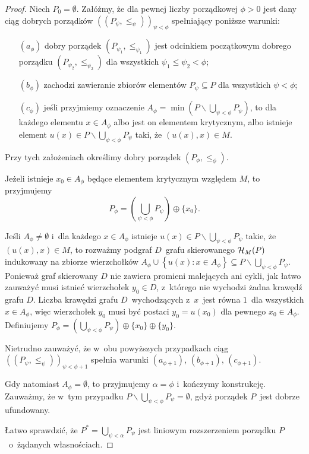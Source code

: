 \begin{proof}
Niech $P_0=\emptyset$. Załóżmy, że dla pewnej liczby porządkowej $\phi>0$ jest dany ciąg dobrych porządków $\left(\left(P_\psi,\leq_\psi\right)\right)_{\psi<\phi}$ spełniający poniższe warunki:
\begin{itemize}
\item[$(a_{\phi})$] dobry porządek $\left(P_{\psi_1},\leq_{\psi_1}\right)$ jest odcinkiem początkowym dobrego porządku $\left(P_{\psi_2},\leq_{\psi_2}\right)$ dla wszystkich $\psi_1\leq\psi_2<\phi$;
\item[$(b_{\phi})$] zachodzi zawieranie zbiorów elementów $P_\psi\subseteq P$ dla wszystkich $\psi<\phi$;
\item[$(c_{\phi})$] jeśli przyjmiemy oznaczenie $A_{\phi}=\min\left(P\smallsetminus\bigcup_{\psi<\phi}P_\psi\right)$, to dla każdego elementu $x\in A_{\phi}$ albo jest on elementem krytycznym, albo istnieje element $u(x)\in P\smallsetminus \bigcup_{\psi<\phi}P_\psi$ taki, że $(u(x),x)\in M$.
\end{itemize}
Przy tych założeniach określimy dobry porządek $\left(P_{\phi},\leq_{\phi}\right)$.

Jeżeli istnieje $x_0\in A_{\phi}$ będące elementem krytycznym względem $M$, to przyjmujemy \[P_{\phi}=\left(\bigcup_{\psi<\phi}P_\psi\right)\oplus \{x_0\}.\] 

Jeśli $A_{\phi}\not=\emptyset$ i~dla każdego $x\in A_{\phi}$ istnieje $u(x)\in P\smallsetminus \bigcup_{\psi<\phi}P_\psi$ takie, że $(u(x),x)\in M$, to rozważmy podgraf $D$~grafu skierowanego $\mathcal{H}_M(P)$ indukowany na zbiorze wierzchołków $A_{\phi}\cup \left\{u(x):x\in A_{\phi}\right\}\subseteq P\smallsetminus \bigcup_{\psi<\phi}P_\psi$.  Ponieważ graf skierowany $D$ nie zawiera promieni malejących ani cykli, jak łatwo zauważyć musi istnieć wierzchołek $y_0\in D$, z~którego nie wychodzi żadna krawędź grafu $D$. Liczba krawędzi grafu $D$~wychodzących z~$x$~jest równa $1$~dla wszystkich $x\in A_{\phi}$, więc wierzchołek $y_0$ musi być postaci $y_0=u(x_0)$ dla pewnego $x_0\in A_{\phi}$. Definiujemy $P_{\phi}=\left(\bigcup_{\psi<\phi}P_\psi\right)\oplus \{x_0\}\oplus\{y_0\}$.

Nietrudno zauważyć, że w~obu powyższych przypadkach ciąg $\left(\left(P_\psi,\leq_\psi\right)\right)_{\psi<\phi+1}$ spełnia warunki $(a_{\phi+1})$, $(b_{\phi+1})$, $(c_{\phi+1})$.

Gdy natomiast $A_{\phi}=\emptyset$, to przyjmujemy $\alpha=\phi$ i~kończymy konstrukcję. Zauważmy, że w~tym przypadku $P\smallsetminus \bigcup_{\psi<\phi}P_\psi=\emptyset$, gdyż porządek $P$~jest dobrze ufundowany.

Łatwo sprawdzić, że $P^*=\bigcup_{\psi<\alpha}P_\psi$ jest liniowym rozszerzeniem porządku $P$~o~żądanych własnościach.
\end{proof}



